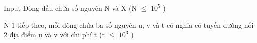 Input
Dòng đầu chứa số nguyên N và X (N  $\le$  $10^{5}$ )


N-1 tiếp theo, mỗi dòng chứa ba số nguyên u, v và t có nghĩa có tuyến đường nối 2 địa điểm u và v với chi phí t (t  $\le$  $10^{3}$ )